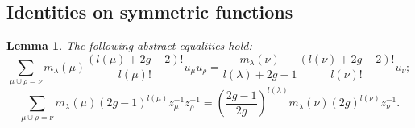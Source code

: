 \documentclass[12pt]{amsart}
\theoremstyle{plain}
\newtheorem{lemma}{Lemma}[section]
\theoremstyle{remark}
\begin{document}
\subsection{Identities on symmetric functions}
\begin{lemma}
 \label{lem:technical1}
The following abstract equalities hold:
\begin{equation}
\label{sym:R'}
 \sum_{\mu \cup \rho = \nu} m_{\lambda}(\mu) \frac{(l(\mu) + 2g -2)!}{l(\mu)!}
u_{\mu} u_{\rho} = \frac{m_{\lambda}(\nu)}{l(\lambda) + 2g -1} \frac{(l(\nu) +
2g - 2)!}{l(\nu)!} u_{\nu};
\end{equation}
\begin{equation}
\label{sym:Q'}
 \sum_{\mu \cup \rho = \nu} m_{\lambda}(\mu) (2g -1)^{l(\mu)}
z^{-1}_{\mu} z^{-1}_{\rho} = \left(\frac{2g-1}{2g}\right)^{l(\lambda)}
m_{\lambda}(\nu)(2g)^{l(\nu)} z^{-1}_{\nu}.
\end{equation}
\end{lemma}
\end{document}
